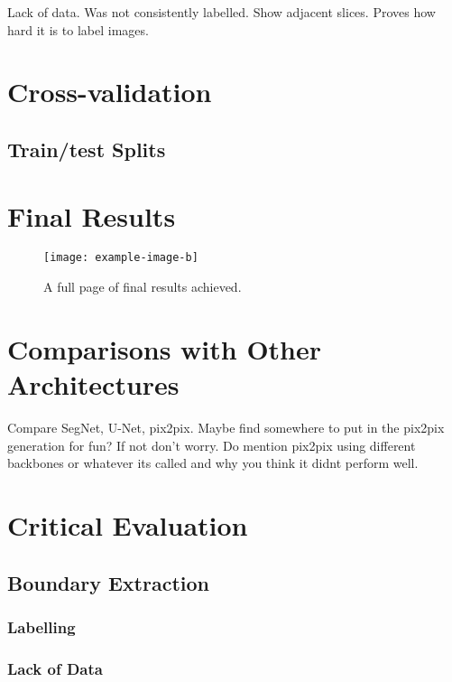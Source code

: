 Lack of data. Was not consistently labelled. Show adjacent slices. Proves how hard it is to label images.

\section{Cross-validation}
\label{sec:evalcrossval}

\subsection{Train/test Splits}

\section{Final Results}

\begin{figure}[!p]
    \centering
    \texttt{[image: example-image-b]}
    \caption{A full page of final results achieved.}
    \label{fig:finalresults}
\end{figure}

\section{Comparisons with Other Architectures}

Compare SegNet, U-Net, pix2pix. Maybe find somewhere to put in the pix2pix generation for fun? If not don't worry. Do mention pix2pix using different backbones or whatever its called and why you think it didnt perform well.

\section{Critical Evaluation}

\subsection{Boundary Extraction}

\subsubsection{Labelling}

\subsubsection{Lack of Data}


